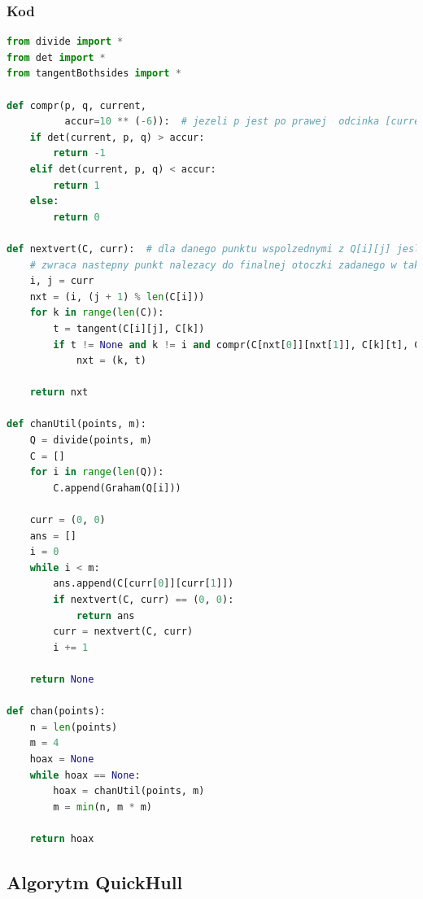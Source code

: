 \documentclass[11pt]{article}
\theoremstyle{remark} \newtheorem{definition}{def.}
\theoremstyle{definition} \newtheorem{twierdzenie}{tw.}
\begin{document}
    \subsubsection{Kod}
\begin{lstlisting}[language=Python]
from divide import *
from det import *
from tangentBothsides import *

def compr(p, q, current,
          accur=10 ** (-6)):  # jezeli p jest po prawej  odcinka [current,q] - jest 'wiekszy', to zwracamy 1
    if det(current, p, q) > accur:
        return -1
    elif det(current, p, q) < accur:
        return 1
    else:
        return 0

def nextvert(C, curr):  # dla danego punktu wspolzednymi z Q[i][j] jesli jest to punkt nalezacy do finalnej otoczki, to
    # zwraca nastepny punkt nalezacy do finalnej otoczki zadanego w takich samych wspolzednych Q[nxt[0]][nxt[1]]
    i, j = curr
    nxt = (i, (j + 1) % len(C[i]))
    for k in range(len(C)):
        t = tangent(C[i][j], C[k])
        if t != None and k != i and compr(C[nxt[0]][nxt[1]], C[k][t], C[i][j]) > 0 and (k, t) != (curr):
            nxt = (k, t)

    return nxt

def chanUtil(points, m):
    Q = divide(points, m)
    C = []
    for i in range(len(Q)):
        C.append(Graham(Q[i]))

    curr = (0, 0)
    ans = []
    i = 0
    while i < m:
        ans.append(C[curr[0]][curr[1]])
        if nextvert(C, curr) == (0, 0):
            return ans
        curr = nextvert(C, curr)
        i += 1

    return None

def chan(points):
    n = len(points)
    m = 4
    hoax = None
    while hoax == None:
        hoax = chanUtil(points, m)
        m = min(n, m * m)

    return hoax
\end{lstlisting}
    

\subsection{Algorytm QuickHull}
\end{document}

